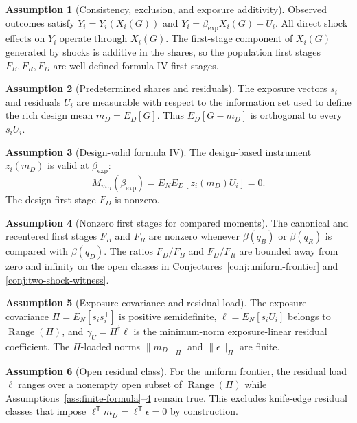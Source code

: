 \documentclass[11pt]{article}
\newcommand{\transpose}{\mathsf{T}}
\theoremstyle{definition}
\newtheorem{assumption}{Assumption}
\theoremstyle{plain}
\theoremstyle{remark}
\begin{document}
\begin{assumption}[Consistency, exclusion, and exposure additivity]\label{ass:structural-exposure}
Observed outcomes satisfy \(Y_i=Y_i(X_i(G))\) and \(Y_i=\beta_{\exp}X_i(G)+U_i\).  All direct shock effects on \(Y_i\) operate through \(X_i(G)\).  The first-stage component of \(X_i(G)\) generated by shocks is additive in the shares, so the population first stages \(F_B,F_R,F_D\) are well-defined formula-IV first stages.
\end{assumption}

\begin{assumption}[Predetermined shares and residuals]\label{ass:predetermined}
The exposure vectors \(s_i\) and residuals \(U_i\) are measurable with respect to the information set used to define the rich design mean \(m_D=E_D[G]\).  Thus \(E_D[G-m_D]\) is orthogonal to every \(s_iU_i\).
\end{assumption}

\begin{assumption}[Design-valid formula IV]\label{ass:design-valid}
The design-based instrument \(z_i(m_D)\) is valid at \(\beta_{\exp}\):
\[
  M_{m_D}(\beta_{\exp})=E_NE_D[z_i(m_D)U_i]=0.
\]
The design first stage \(F_D\) is nonzero.
\end{assumption}

\begin{assumption}[Nonzero first stages for compared moments]\label{ass:first-stage}
The canonical and recentered first stages \(F_B\) and \(F_R\) are nonzero whenever \(\beta(q_B)\) or \(\beta(q_R)\) is compared with \(\beta(q_D)\).  The ratios \(F_D/F_B\) and \(F_D/F_R\) are bounded away from zero and infinity on the open classes in Conjectures~\ref{conj:uniform-frontier} and \ref{conj:two-shock-witness}.
\end{assumption}

\begin{assumption}[Exposure covariance and residual load]\label{ass:pi-load}
The exposure covariance \(\Pi=E_N[s_i s_i^\transpose]\) is positive semidefinite, \(\ell=E_N[s_iU_i]\) belongs to \(\operatorname{Range}(\Pi)\), and \(\gamma_U=\Pi^\dagger\ell\) is the minimum-norm exposure-linear residual coefficient.  The \(\Pi\)-loaded norms \(\|m_D\|_\Pi\) and \(\|\epsilon\|_\Pi\) are finite.
\end{assumption}

\begin{assumption}[Open residual class]\label{ass:open-residual}
For the uniform frontier, the residual load \(\ell\) ranges over a nonempty open subset of \(\operatorname{Range}(\Pi)\) while Assumptions~\ref{ass:finite-formula}--\ref{ass:first-stage} remain true.  This excludes knife-edge residual classes that impose \(\ell^\transpose m_D=\ell^\transpose\epsilon=0\) by construction.
\end{assumption}
\end{document}
